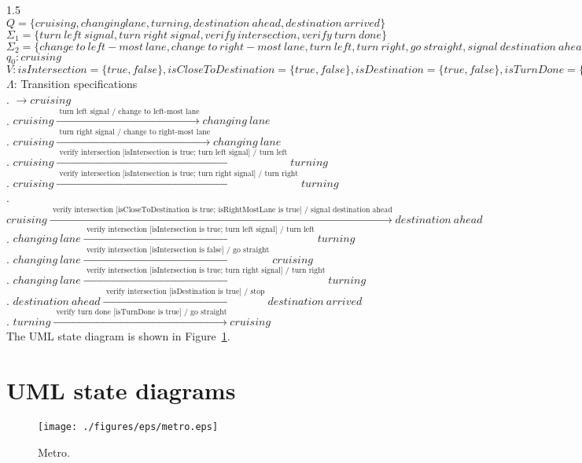 \documentclass[12pt]{article}
\begin{document}
\begin{spacing}{1.5}
\noindent $Q = \{cruising, changing lane, turning, destination~ahead, destination~arrived\}$\\
\noindent $\Sigma_1 = \{turn~left~signal, turn~right~signal, verify~intersection, verify~turn~done\}$\\
\noindent $\Sigma_2 = \{change~to~left-most~lane, change~to~right-most~lane, turn~left, turn~right, go~straight, signal~destination~ahead, stop\}$\\
\noindent $q_0: cruising$\\
\noindent $V: isIntersection = \{true, false\}, isCloseToDestination = \{true, false\}, isDestination = \{true, false\}, isTurnDone = \{true, false\}, isRightMostLane = \{true, false\}$\\
\noindent $\Lambda$: Transition specifications\\
. $\rightarrow cruising$\\
. $cruising \xrightarrow {\text { turn~left~signal / change~to~left-most~lane}} changing~lane$\\
. $cruising \xrightarrow {\text { turn~right~signal / change~to~right-most~lane}} changing~lane$\\
. $cruising \xrightarrow {\text { verify~intersection [isIntersection~is~true; turn~left~signal] / turn~left}} turning$\\
. $cruising \xrightarrow {\text { verify~intersection [isIntersection~is~true; turn~right~signal] / turn~right}} turning$\\
. $cruising \xrightarrow {\text { verify~intersection [isCloseToDestination~is~true; isRightMostLane~is~true] / signal~destination~ahead}} destination~ahead$\\
. $changing~lane \xrightarrow {\text { verify~intersection [isIntersection~is~true; turn~left~signal] / turn~left}} turning$\\
. $changing~lane \xrightarrow {\text { verify~intersection [isIntersection~is~false] / go~straight}} cruising$\\
. $changing~lane \xrightarrow {\text { verify~intersection [isIntersection~is~true; turn~right~signal] / turn right}} turning$\\
. $destination~ahead \xrightarrow {\text { verify~intersection [isDestination~is~true] / stop}} destination~arrived$\\
. $turning \xrightarrow {\text { verify~turn~done [isTurnDone~is~true] / go straight}} cruising$\\

\noindent The UML state diagram is shown in Figure~\ref{fig:metro-fig}.

\newpage

\section{UML state diagrams}

\begin{figure}[h!]
	\centering
		\texttt{[image: ./figures/eps/metro.eps]}
		  \caption{Metro.}
  \label{fig:metro-fig}
\end{figure}

\end{spacing}
\end{document}
